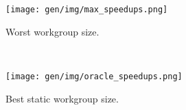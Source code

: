 \begin{subfigure}[h]{\textwidth}
\centering
\texttt{[image: gen/img/max\_speedups.png]}
\caption{%
  Worst workgroup size.%
}
\label{fig:oracle-speedups-worst}
\end{subfigure}
\\
\begin{subfigure}[h]{\textwidth}
\centering
\texttt{[image: gen/img/oracle\_speedups.png]}
\caption{%
  Best static workgroup size.%
}
\label{fig:oracle-speedups-baseline}
\end{subfigure}
